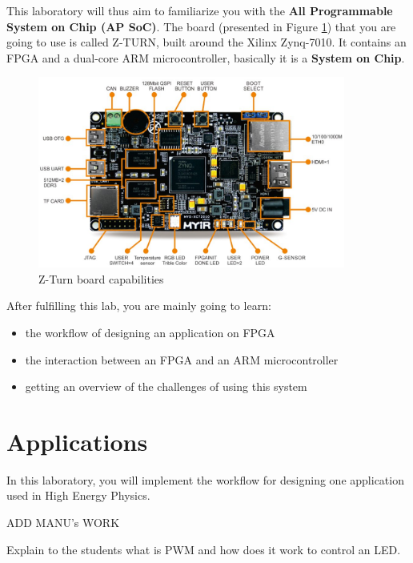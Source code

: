 \documentclass{article}
\begin{document}
This laboratory will thus aim to familiarize you with the \textbf{All Programmable System on Chip (AP SoC)}. The board (presented in Figure \ref{fig:zturnboard}) that you are going to use is called Z-TURN, built around the Xilinx Zynq-7010. It contains an FPGA and a dual-core ARM microcontroller, basically it is a \textbf{System on Chip}.




\begin{figure}[h!]
    \centering
    \includegraphics[width=0.9\textwidth]{img/zturn_details.jpg}
    \caption{Z-Turn board capabilities}
    \label{fig:zturnboard}
\end{figure}






After fulfilling this lab, you are mainly going to learn:
\begin{itemize}
\item the workflow of designing an application on FPGA
\item the interaction between an FPGA and an ARM microcontroller
\item getting an overview of the challenges of using this system
\end{itemize}




\newpage

\section{Applications}


In this laboratory, you will implement the workflow for designing one application used in
High Energy Physics.


ADD MANU's WORK


{\color{red} Explain to the students what is PWM and how does it work to control an LED.}
\end{document}
